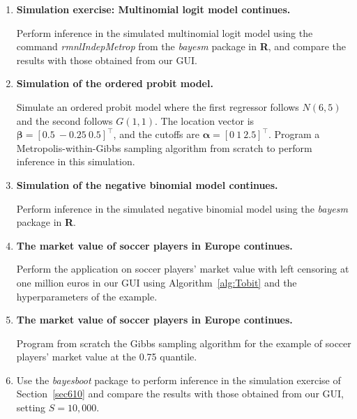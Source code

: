 \begin{enumerate}
	\item \textbf{Simulation exercise: Multinomial logit model continues.}
	  
	Perform inference in the simulated multinomial logit model using the command \textit{rmnlIndepMetrop} from the \textit{bayesm} package in \textbf{R}, and compare the results with those obtained from our GUI.
	
	\item \textbf{Simulation of the ordered probit model.} 
	 
	Simulate an ordered probit model where the first regressor follows $N(6, 5)$ and the second follows $G(1,1)$. The location vector is $\bm{\beta} = [0.5 \ -0.25 \ 0.5]^{\top}$, and the cutoffs are $\bm{\alpha} = [0 \ 1 \ 2.5]^{\top}$. Program a Metropolis-within-Gibbs sampling algorithm from scratch to perform inference in this simulation.
	
	\item \textbf{Simulation of the negative binomial model continues.}
	  
	Perform inference in the simulated negative binomial model using the \textit{bayesm} package in \textbf{R}.
	
	\item \textbf{The market value of soccer players in Europe continues.} 
	 
	Perform the application on soccer players’ market value with left censoring at one million euros in our GUI using Algorithm~\ref{alg:Tobit} and the hyperparameters of the example.
	
	\item \textbf{The market value of soccer players in Europe continues.} 
	 
	Program from scratch the Gibbs sampling algorithm for the example of soccer players’ market value at the 0.75 quantile.
	
	\item Use the \textit{bayesboot} package to perform inference in the simulation exercise of Section~\ref{sec610} and compare the results with those obtained from our GUI, setting $S = 10{,}000$.
\end{enumerate}

